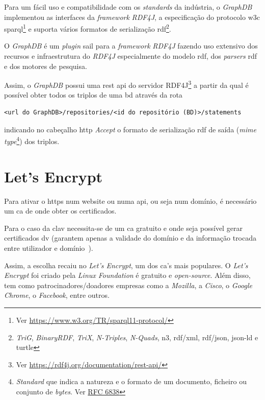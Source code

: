 Para um fácil uso e compatibilidade com os \textit{standards} da indústria, o \textit{GraphDB} implementou as interfaces da \textit{framework} \textit{RDF4J}, a especificação do protocolo \acrshort{w3c} \acrshort{sparql}\footnote{Ver \url{https://www.w3.org/TR/sparql11-protocol/}} e suporta vários formatos de serialização \acrshort{rdf}\footnote{\label{fnRDF}\textit{TriG}, \textit{BinaryRDF}, \textit{TriX}, \textit{N-Triples}, \textit{N-Quads}, \acrshort{n3}, \acrshort{rdf}/\acrshort{xml}, \acrshort{rdf}/\acrshort{json}, \acrshort{json-ld} e \acrshort{turtle}}.~\cite{graphdbAbout}

O \textit{GraphDB} é um \textit{plugin} \acrshort{sail} para a \textit{framework} \textit{RDF4J} fazendo uso extensivo dos recursos e infraestrutura do \textit{RDF4J} especialmente do modelo \acrshort{rdf}, dos \textit{parsers} \acrshort{rdf} e dos motores de pesquisa.~\cite{graphdbArch}

Assim, o \textit{GraphDB} possui uma \acrshort{rest} \acrshort{api} do servidor RDF4J\footnote{Ver \url{https://rdf4j.org/documentation/rest-api/}} a partir da qual é possível obter todos os triplos de uma \acrshort{bd} através da rota
\begin{verbatim}
<url do GraphDB>/repositories/<id do repositório (BD)>/statements
\end{verbatim}
indicando no cabeçalho \acrshort{http} \textit{Accept} o formato de serialização \acrshort{rdf} de saída (\textit{\acrshort{mime} type}\footnote{\textit{Standard} que indica a natureza e o formato de um documento, ficheiro ou conjunto de \textit{bytes}. Ver \href{https://tools.ietf.org/html/rfc6838}{RFC 6838}}) dos triplos.

\section{Let's Encrypt}

Para ativar o \acrshort{https} num website ou numa \acrshort{api}, ou seja num domínio, é necessário um \acrfull{ca} de onde obter os certificados.

Para o caso da \acrshort{clav} necessita-se de um \acrshort{ca} gratuito e onde seja possível gerar certificados \acrfull{dv} (garantem apenas a validade do domínio e da informação trocada entre utilizador e domínio~\cite{certsTypes}).

Assim, a escolha recaiu no \textit{Let's Encrypt}, um dos \acrshort{ca}'s mais populares. O \textit{Let's Encrypt} foi criado pela \textit{Linux Foundation} é gratuito e \textit{open-source}. Além disso, tem como patrocinadores/doadores empresas como a \textit{Mozilla}, a \textit{Cisco}, o \textit{Google Chrome}, o \textit{Facebook}, entre outros. 

